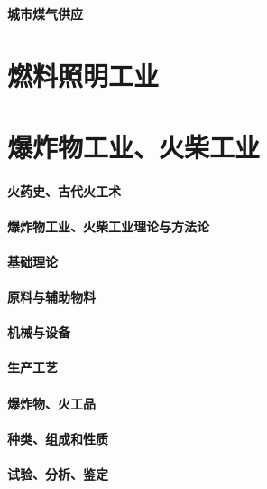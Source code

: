 \documentclass[UTF8]{../../ApplicationUniverse}
\begin{document}
\subsubsection{城市煤气供应}








\chapter{燃料照明工业}










\chapter{爆炸物工业、火柴工业}
\subsubsection{火药史、古代火工术}
\subsubsection{爆炸物工业、火柴工业理论与方法论}
    \subsubsection{基础理论}
    \subsubsection{原料与辅助物料}
    \subsubsection{机械与设备}
    \subsubsection{生产工艺}
    \subsubsection{爆炸物、火工品}
        \subsubsection{种类、组成和性质}
        \subsubsection{试验、分析、鉴定}
\end{document}
